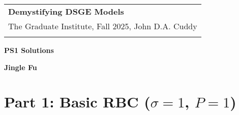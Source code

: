 \documentclass[a4paper,12pt]{article}
\theoremstyle{nonitalic}
\newenvironment{solution}[1]
  {\renewcommand\theinnercustomsol{#1}\innercustomsol}
  {\endinnercustomsol}
\newcounter{solutionctr}
\renewcommand{\thesolutionctr}{(\alph{solutionctr})}
\newenvironment{autosolution}
  {\stepcounter{solutionctr}\begin{solution}{\thesolutionctr}}
  {\end{solution}}
\begin{document}
\thispagestyle{empty} %

\begin{tabular}{p{15.5cm}} %
{\large \bf Demystifying DSGE Models} \\
The Graduate Institute, Fall 2025, John D.A. Cuddy\\
\hline %
\\
\end{tabular} %

\vspace*{0.3cm} %

\begin{center} %
	{\Large \bf PS1 Solutions} %
	\vspace{2mm}
	
	{\bf Jingle Fu} %
		
\end{center}  

\vspace{0.4cm}



\section{Part 1: Basic RBC ($\sigma=1$, $P=1$)}
\end{document}
